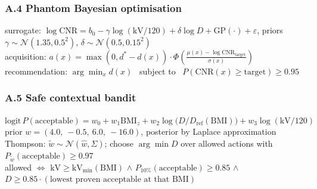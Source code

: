 \documentclass[10pt,a4paper]{article}
\begin{document}
\subsubsection{A.4 Phantom Bayesian optimisation}
\begin{eqbox}
surrogate: $\log \mathrm{CNR} = b_0 - \gamma\log(\mathrm{kV}/120) + \delta\log D + \mathrm{GP}(\cdot) + \varepsilon$,
\quad priors $\gamma \sim \mathcal{N}(1.35, 0.5^2)$, $\delta \sim \mathcal{N}(0.5, 0.15^2)$\\[4pt]
acquisition: $a(x) = \max(0, d^{*} - d(x)) \cdot
\Phi\!\left(\frac{\mu(x) - \log \mathrm{CNR_{target}}}{\sigma(x)}\right)$\\[4pt]
recommendation: $\arg\min_x d(x)$ \ subject to \ $P(\mathrm{CNR}(x) \ge \text{target}) \ge 0.95$
\end{eqbox}

\subsubsection{A.5 Safe contextual bandit}
\begin{eqbox}
$\mathrm{logit}\,P(\text{acceptable}) = w_0 + w_1 \mathrm{BMI}_z + w_2 \log\!\big(D/D_{\mathrm{ref}}(\mathrm{BMI})\big) + w_3 \log(\mathrm{kV}/120)$\\[4pt]
prior $w = (4.0,\ -0.5,\ 6.0,\ -16.0)$, posterior by Laplace approximation\\[4pt]
Thompson: $\tilde{w} \sim \mathcal{N}(\hat{w}, \Sigma)$; choose $\arg\min D$ over allowed actions with
$P_{\tilde{w}}(\text{acceptable}) \ge 0.97$\\[4pt]
allowed $\Leftrightarrow$ $\mathrm{kV} \ge \mathrm{kV_{min}(BMI)}$ $\wedge$
$P_{10\%}(\text{acceptable}) \ge 0.85$ $\wedge$
$D \ge 0.85 \cdot (\text{lowest proven acceptable at that BMI})$
\end{eqbox}
\end{document}
